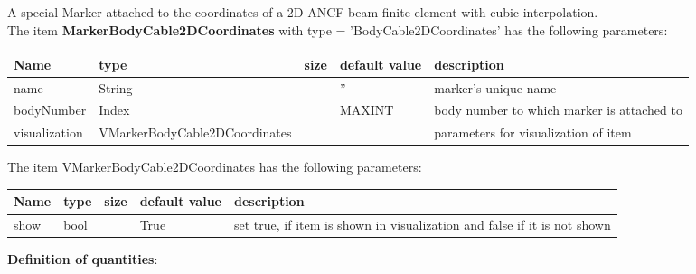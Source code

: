 A special Marker attached to the coordinates of a 2D ANCF beam finite element with cubic interpolation.
 \\\vspace{12pt} \noindent The item {\bf MarkerBodyCable2DCoordinates} with type = 'BodyCable2DCoordinates' has the following parameters:\vspace{-1cm}\\ 
\begin{center}
  \footnotesize
  \begin{longtable}{| p{4.5cm} | p{2.5cm} | p{0.5cm} | p{2.5cm} | p{6cm} |}
    \hline
    \bf Name & \bf type & \bf size & \bf default value & \bf description \\ \hline
    name &     String &      &     '' &     marker's unique name\\ \hline
    bodyNumber &     Index &      &     MAXINT &     body number to which marker is attached to\\ \hline
    visualization & VMarkerBodyCable2DCoordinates & & & parameters for visualization of item \\ \hline
	  \end{longtable}
	\end{center}
The item VMarkerBodyCable2DCoordinates has the following parameters:\vspace{-1cm}\\ 
\begin{center}
  \footnotesize
  \begin{longtable}{| p{4.5cm} | p{2.5cm} | p{0.5cm} | p{2.5cm} | p{6cm} |}
    \hline
    \bf Name & \bf type & \bf size & \bf default value & \bf description \\ \hline
    show &     bool &      &     True &     set true, if item is shown in visualization and false if it is not shown\\ \hline
	  \end{longtable}
	\end{center}
{\bf Definition of quantities}:\\

\newpage

